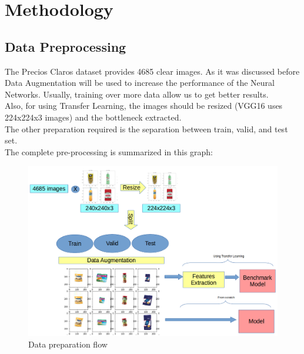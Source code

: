 \documentclass[a4paper,10pt]{article}
\begin{document}
\section{Methodology}

\subsection{Data Preprocessing}

The Precios Claros dataset provides 4685 clear images. As it was discussed before Data Augmentation will be used to increase the performance of the Neural Networks. Usually, training over more data allow us to get better results. \\

Also, for using Transfer Learning, the images should be resized (VGG16 uses 224x224x3 images) and the bottleneck extracted. \\

The other preparation required is the separation between train, valid, and test set. \\

The complete pre-processing is summarized in this graph: 
  
\begin{figure}[ht]
  \includegraphics[width=\linewidth]{data_processing.png}
  \caption{Data preparation flow}
  \label{fig:boat1}
\end{figure}
\end{document}
